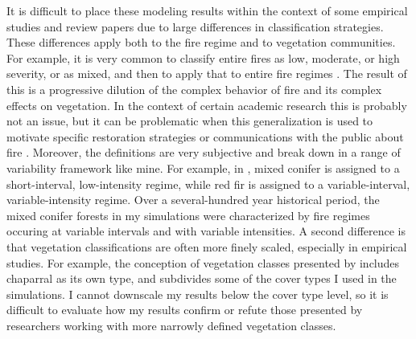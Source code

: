 It is difficult to place these modeling results within the context of some empirical studies and review papers due to large differences in classification strategies. These differences apply both to the fire regime and to vegetation communities. For example, it is very common to classify entire fires as low, moderate, or high severity, or as mixed, and then to apply that to entire fire regimes \citep{Chang1995}. The result of this is a progressive dilution of the complex behavior of fire and its complex effects on vegetation. In the context of certain academic research this is probably not an issue, but it can be problematic when this generalization is used to motivate specific restoration strategies or communications with the public about fire . Moreover, the definitions are very subjective and break down in a range of variability framework like mine. For example, in \citet{Chang1995}, mixed conifer is assigned to a short-interval, low-intensity regime, while red fir is assigned to a variable-interval, variable-intensity regime. Over a several-hundred year historical period, the mixed conifer forests in my simulations were characterized by fire regimes occuring at variable intervals and with variable intensities.
%
A second difference is that vegetation classifications are often more finely scaled, especially in empirical studies. For example, the conception of vegetation classes presented by \citet{Skinner1996} includes chaparral as its own type, and subdivides some of the cover types I used in the simulations. I cannot downscale my results below the cover type level, so it is difficult to evaluate how my results confirm or refute those presented by researchers working with more narrowly defined vegetation classes.

